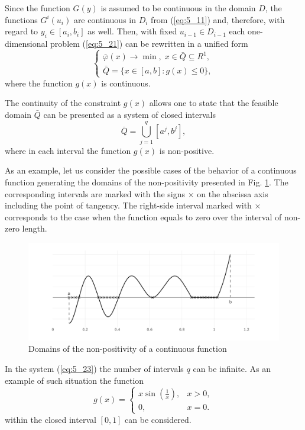 Since the function $G(y)$ is assumed to be continuous in the domain $D$, the functions $G^i(u_i)$ are continuous in $D_i$  from (\ref{eq:5_11}) and, therefore, with regard to $y_i\in [a_i,b_i]$  as well. Then, with fixed $u_{i-1}\in D_{i-1}$  each one-dimensional problem (\ref{eq:5_21}) can be rewritten in a unified form
\begin{equation}
\label{eq:5_22}
  \begin{cases}
    \bar{\varphi}(x)\rightarrow\min,\;x\in\bar{Q}\subseteq R^1, \\
    \bar{Q}=\{x\in[a,b]:g(x)\leq 0\},
  \end{cases}
\end{equation}
where the function $g(x)$ is continuous.

The continuity of the constraint $g(x)$ allows one to state that the feasible domain $\bar{Q}$  can be presented as a system of closed intervals
\begin{equation}
\label{eq:5_23}
\bar{Q}=\bigcup_{j=1}^q{[a^j,b^j]},
\end{equation}
where in each interval the function $g(x)$ is non-positive. 

As an example, let us consider the possible cases of the behavior of a continuous function generating the domains of the non-positivity presented in Fig. \ref{fig:5_3}. The corresponding intervals  are marked with  the signs $\times$  on the abscissa axis including the point of tangency. The right-side interval marked with $\times$ corresponds to the case when the function equals to zero over the interval of non-zero length. 
\begin{figure}[t]
\centering
\includegraphics[width=1.1\linewidth]{figures/figure_5_3.pdf}
\caption{Domains of the non-positivity of a continuous function}
\label{fig:5_3}    
\end{figure}
In the system (\ref{eq:5_23}) the number of intervals $q$ can be infinite. As an example of such situation the function
\begin{displaymath}
g(x)=
  \begin{cases}
    x\sin(\frac{1}{x}), & x>0,\\
    0, & x=0.
  \end{cases}
\end{displaymath}
within the closed interval $[0,1]$ can be considered.

